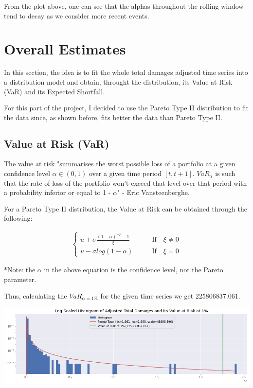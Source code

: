 \documentclass[paper=a4, fontsize=11pt]{scrartcl} %
\begin{document}
From the plot above, one can see that the alphas throughout the rolling window tend to decay as we consider more recent events.


\section{Overall Estimates}
In this section, the idea is to fit the whole total damages adjusted time series into a distribution model and obtain, throught the distribution, its Value at Risk (VaR) and its Expected Shortfall.

For this part of the project, I decided to use the Pareto Type II distribution to fit the data since, as shown before, fits better the data than Pareto Type II.

\subsection{Value at Risk (VaR)}
The value at risk "summarises the worst possible loss of a portfolio at a given confidence level $\alpha \in (0, 1)$ over a given time period $[t, t+1]$. $VaR_\alpha$ is such that the rate of loss of the portfolio won’t exceed that level over that period with a probability inferior or equal to 1 - $\alpha$" - Eric Vansteenberghe. 

For a Pareto Type II distribution, the Value at Risk can be obtained through the following:

\begin{align*}
    \begin{cases}
        u + \sigma \frac{(1 - \alpha)^{-\xi} - 1}{\xi} \qquad & \text{If} \quad \xi \neq 0  \\
        u - \sigma log(1-\alpha) \qquad & \text{If} \quad \xi = 0
    \end{cases}  
\end{align*}

*Note: the $\alpha$ in the above equation is the confidence level, not the Pareto parameter.

Thus, calculating the $VaR_{\alpha=1\%}$ for the given time series we get 225806837.061.

\begin{center}
    \includegraphics[scale=0.5]{imgs/VaR.png}
\end{center}
\end{document}
